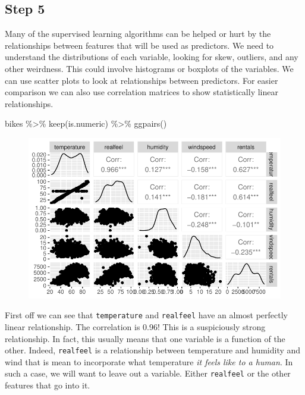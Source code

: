 \documentclass[
  letterpaper,
  DIV=11,
  numbers=noendperiod]{scrartcl}
\newenvironment{Shaded}{\begin{snugshade}}{\end{snugshade}}
\newcommand{\FunctionTok}[1]{\textcolor[rgb]{0.28,0.35,0.67}{#1}}
\newcommand{\NormalTok}[1]{\textcolor[rgb]{0.00,0.23,0.31}{#1}}
\newcommand{\SpecialCharTok}[1]{\textcolor[rgb]{0.37,0.37,0.37}{#1}}
\begin{document}
\hypertarget{step-5}{%
\subsection{Step 5}\label{step-5}}

Many of the supervised learning algorithms can be helped or hurt by the
relationships between features that will be used as predictors. We need
to understand the distributions of each variable, looking for skew,
outliers, and any other weirdness. This could involve histograms or
boxplots of the variables. We can use scatter plots to look at
relationships between predictors. For easier comparison we can also use
correlation matrices to show statistically linear relationships.

\begin{Shaded}
\begin{Highlighting}[]
\NormalTok{bikes }\SpecialCharTok{\%\textgreater{}\%}
  \FunctionTok{keep}\NormalTok{(is.numeric) }\SpecialCharTok{\%\textgreater{}\%}
  \FunctionTok{ggpairs}\NormalTok{()}
\end{Highlighting}
\end{Shaded}

\begin{figure}[H]

{\centering \includegraphics{index_files/figure-pdf/unnamed-chunk-13-1.pdf}

}

\end{figure}

First off we can see that \texttt{temperature} and \texttt{realfeel}
have an almost perfectly linear relationship. The correlation is 0.96!
This is a suspiciously strong relationship. In fact, this usually means
that one variable is a function of the other. Indeed, \texttt{realfeel}
is a relationship between temperature and humidity and wind that is mean
to incorporate what temperature \emph{it feels like to a human}. In such
a case, we will want to leave out a variable. Either \texttt{realfeel}
or the other features that go into it.
\end{document}
